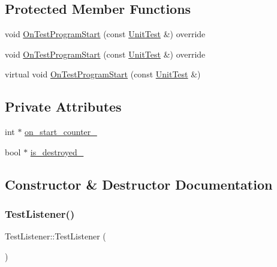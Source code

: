 \subsection*{Protected Member Functions}
\begin{DoxyCompactItemize}
\item 
void \mbox{\hyperlink{class_test_listener_ab1edf894efc1104f7ce35563bc24de23}{On\+Test\+Program\+Start}} (const \mbox{\hyperlink{classtesting_1_1_unit_test}{Unit\+Test}} \&) override
\item 
void \mbox{\hyperlink{class_test_listener_ab1edf894efc1104f7ce35563bc24de23}{On\+Test\+Program\+Start}} (const \mbox{\hyperlink{classtesting_1_1_unit_test}{Unit\+Test}} \&) override
\item 
virtual void \mbox{\hyperlink{class_test_listener_a6218f522f5b6b37050ff0ea630ac5fd3}{On\+Test\+Program\+Start}} (const \mbox{\hyperlink{classtesting_1_1_unit_test}{Unit\+Test}} \&)
\end{DoxyCompactItemize}
\subsection*{Private Attributes}
\begin{DoxyCompactItemize}
\item 
int $\ast$ \mbox{\hyperlink{class_test_listener_ac4c9d9e15b1d1d54ec522bc605879d44}{on\+\_\+start\+\_\+counter\+\_\+}}
\item 
bool $\ast$ \mbox{\hyperlink{class_test_listener_a0185f234a8dc2f93b8ca0ba6d9a7ae41}{is\+\_\+destroyed\+\_\+}}
\end{DoxyCompactItemize}


\subsection{Constructor \& Destructor Documentation}
\mbox{\label{class_test_listener_ae20c874ce92777371de6d024df229e9f}} 
\subsubsection{\texorpdfstring{TestListener()}{TestListener()}\hspace{0.1cm}{\footnotesize\ttfamily [1/6]}}
{\footnotesize\ttfamily Test\+Listener\+::\+Test\+Listener (\begin{DoxyParamCaption}{ }\end{DoxyParamCaption})\hspace{0.3cm}{\ttfamily [inline]}}

